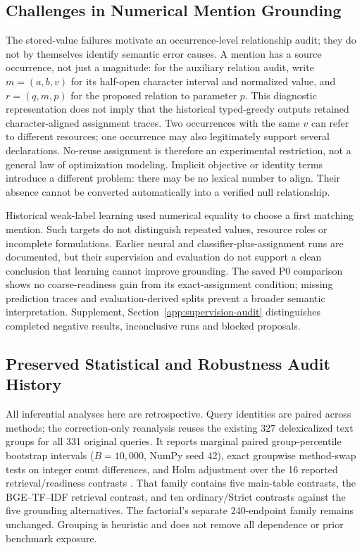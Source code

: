 \subsection{Challenges in Numerical Mention Grounding}
\label{app:occurrence-boundary}

The stored-value failures motivate an occurrence-level relationship audit; they do not by themselves identify semantic error causes. A mention has a source occurrence, not just a magnitude: for the auxiliary relation audit, write $m=(a,b,v)$ for its half-open character interval and normalized value, and $r=(q,m,p)$ for the proposed relation to parameter $p$. This diagnostic representation does not imply that the historical typed-greedy outputs retained character-aligned assignment traces. Two occurrences with the same $v$ can refer to different resources; one occurrence may also legitimately support several declarations. No-reuse assignment is therefore an experimental restriction, not a general law of optimization modeling. Implicit objective or identity terms introduce a different problem: there may be no lexical number to align. Their absence cannot be converted automatically into a verified null relationship.

Historical weak-label learning used numerical equality to choose a first matching mention. Such targets do not distinguish repeated values, resource roles or incomplete formulations. Earlier neural and classifier-plus-assignment runs are documented, but their supervision and evaluation do not support a clean conclusion that learning cannot improve grounding. The saved P0 comparison shows no coarse-readiness gain from its exact-assignment condition; missing prediction traces and evaluation-derived splits prevent a broader semantic interpretation. Supplement, Section~\ref{app:supervision-audit} distinguishes completed negative results, inconclusive runs and blocked proposals.


\subsection{Preserved Statistical and Robustness Audit History}
\label{app:statistical-history}

All inferential analyses here are retrospective. Query identities are paired across methods; the correction-only reanalysis reuses the existing 327 delexicalized text groups for all 331 original queries. It reports marginal paired group-percentile bootstrap intervals ($B=10{,}000$, NumPy seed 42), exact groupwise method-swap tests on integer count differences, and Holm adjustment over the 16 reported retrieval/readiness contrasts \cite{holm1979followup}. That family contains five main-table contrasts, the BGE--TF--IDF retrieval contrast, and ten ordinary/Strict contrasts against the five grounding alternatives. The factorial's separate 240-endpoint family remains unchanged. Grouping is heuristic and does not remove all dependence or prior benchmark exposure.

